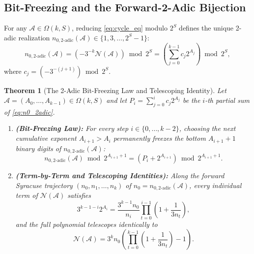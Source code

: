 \documentclass[11pt, a4paper]{amsart}
\newtheorem{theorem}{Theorem}[section]
\theoremstyle{definition}
\newcommand{\N}{\mathcal{N}}
\newcommand{\A}{\mathcal{A}}
\begin{document}
\subsection{Bit-Freezing and the Forward-2-Adic Bijection}

For any $\A \in \Omega(k, S)$, reducing \eqref{eq:cycle_eq} modulo $2^S$ defines the unique 2-adic realization $n_{0,\text{2-adic}}(\A) \in \{1, 3, \dots, 2^S - 1\}$:
\begin{equation}\label{eq:n0_2adic}
n_{0,\text{2-adic}}(\A) = \left( -3^{-k} \N(\A) \right) \bmod 2^S = \left( \sum_{j=0}^{k-1} c_j 2^{A_j} \right) \bmod 2^S,
\end{equation}
where $c_j = (-3^{-(j+1)}) \bmod 2^S$.

\begin{theorem}[The 2-Adic Bit-Freezing Law and Telescoping Identity]\label{thm:bit_freezing}
Let $\A = (A_0, \dots, A_{k-1}) \in \Omega(k, S)$ and let $P_i = \sum_{j=0}^{i} c_j 2^{A_j}$ be the $i$-th partial sum of \eqref{eq:n0_2adic}.
\begin{enumerate}
    \item \textbf{(Bit-Freezing Law):} For every step $i \in \{0, \dots, k-2\}$, choosing the next cumulative exponent $A_{i+1} > A_i$ permanently freezes the bottom $A_{i+1} + 1$ binary digits of $n_{0,\text{2-adic}}(\A)$:
    \begin{equation}\label{eq:bit_freeze}
    n_{0,\text{2-adic}}(\A) \bmod 2^{A_{i+1}+1} = \left( P_i + 2^{A_{i+1}} \right) \bmod 2^{A_{i+1}+1}.
    \end{equation}
    \item \textbf{(Term-by-Term and Telescoping Identities):} Along the forward Syracuse trajectory $(n_0, n_1, \dots, n_k)$ of $n_0 = n_{0,\text{2-adic}}(\A)$, every individual term of $\N(\A)$ satisfies
    \begin{equation}\label{eq:term_id}
    3^{k-1-i} 2^{A_i} = \frac{3^{k-1} n_0}{n_i} \prod_{t=0}^{i-1} \left(1 + \frac{1}{3n_t}\right),
    \end{equation}
    and the full polynomial telescopes identically to
    \begin{equation}\label{eq:telescoping}
    \N(\A) = 3^k n_0 \left( \prod_{t=0}^{k-1} \left(1 + \frac{1}{3n_t}\right) - 1 \right).
    \end{equation}
\end{enumerate}
\end{theorem}
\end{document}
